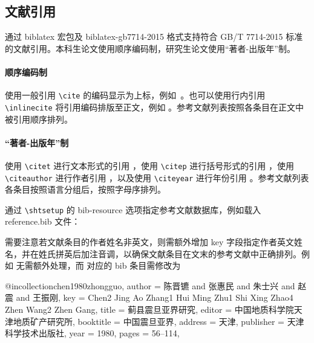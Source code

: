 \documentclass[doctor]{shtthesis}
\begin{document}
\subsection{文献引用} \label{sec::citation}
\shtthesis{} 通过 \textsf{biblatex} 宏包及 \textsf{biblatex-gb7714-2015} 格式支持符合 GB/T 7714-2015 标准的文献引用。本科生论文使用顺序编码制，研究生论文使用“著者-出版年”制。

\paragraph{顺序编码制}
使用一般引用 \verb|\cite| 的编码显示为上标，例如~\cite{stamerjohanns2009mathml, yuan2012lana}。也可以使用行内引用 \verb|\inlinecite| 将引用编码排版至正文，例如 。参考文献列表按照各条目在正文中被引用顺序排列。

\paragraph{“著者-出版年”制}
使用 \verb|\citet| 进行文本形式的引用 \citet{Bohan1928}，使用 \verb|\citep| 进行括号形式的引用 \citep{yuan2012lana}，使用 \verb|\citeauthor| 进行作者引用 \citeauthor{niu2013zonghe}，以及使用 \verb|\citeyear| 进行年份引用 \citeyear{walls2013drought}。参考文献列表各条目按照语言分组后，按照字母序排列。

\shtthesis{} 通过 \verb|\shtsetup| 的 bib-resource 选项指定参考文献数据库，例如载入 reference.bib 文件：

需要注意若文献条目的作者姓名非英文，则需额外增加 key 字段指定作者英文姓名，并在姓氏拼英后加注音调，以确保文献条目在文末的参考文献中正确排列。例如 \citet{bravo1990comparative} 无需额外处理，而 \citet{chen1980zhongguo} 对应的 bib 条目需修改为
\begin{latex}
@incollection{chen1980zhongguo,
  author    = {陈晋镳 and 张惠民 and 朱士兴 and 赵震 and 王振刚},
  key       = {Chen2 Jing Ao Zhang1 Hui Ming Zhu1 Shi Xing Zhao4 Zhen Wang2 Zhen Gang},
  title     = {蓟县震旦亚界研究},
  editor    = {中国地质科学院天津地质矿产研究所},
  booktitle = {中国震旦亚界},
  address   = {天津},
  publisher = {天津科学技术出版社},
  year      = {1980},
  pages     = {56--114},
}
\end{latex}
\end{document}

